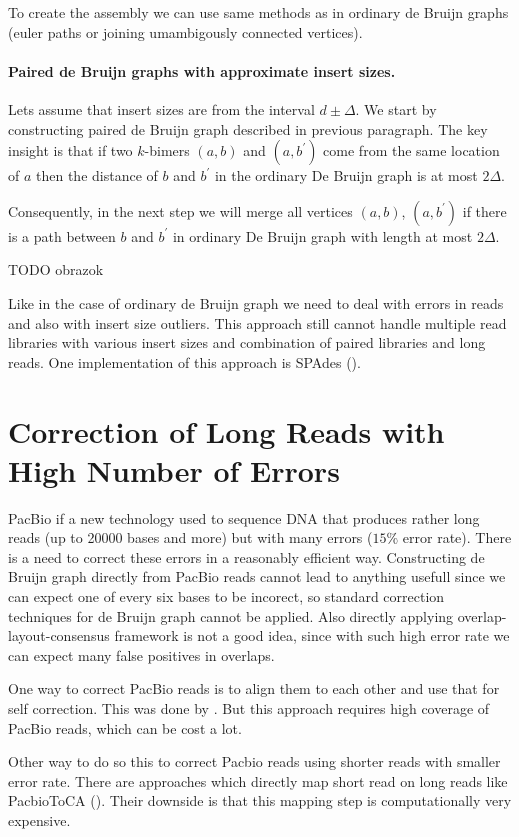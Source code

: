 To create the assembly we can use same methods as in ordinary de Bruijn graphs
(euler paths or joining umambigously connected vertices).

\paragraph{Paired de Bruijn graphs with approximate insert sizes.}
Lets assume that insert sizes are from the interval $d \pm \Delta$.
We start by constructing paired de Bruijn graph described in previous paragraph.
The key insight is that if two $k$-bimers $(a, b)$ and $(a, b^{'})$ come from
the same location of $a$ then the distance of $b$ and $b^{'}$ in the ordinary De Bruijn graph is at most $2\Delta$.

Consequently, in the next step we will merge all vertices $(a, b)$, $(a, b^{'})$ if there is a path
between $b$ and $b^{'}$ in ordinary De Bruijn graph with length at most $2\Delta$.

TODO obrazok

\bigskip
Like in the case of ordinary de Bruijn graph we need to deal with errors in reads
and also with insert size outliers. This approach still cannot handle multiple
read libraries with various insert sizes and combination of paired libraries and long reads.
One implementation of this approach is SPAdes (\cite{Spades}).


\section{Correction of Long Reads with High Number of Errors}

PacBio if a new technology used to sequence DNA that produces
rather long reads (up to 20000 bases and more) but with many errors
($15\%$ error rate). There is a need to correct these errors in a reasonably
efficient way. Constructing de Bruijn graph directly from PacBio reads
cannot lead to anything usefull since we can expect one of every six bases to be
incorect, so standard correction techniques for de Bruijn graph cannot be applied.
Also directly applying overlap-layout-consensus framework is not a good idea, since
with such high error rate we can expect many false positives in overlaps.

One way to correct PacBio reads is to align them to each other and use that for self correction.
This was done by \citet{MHAP}. But this approach requires high coverage
of PacBio reads, which can be cost a lot.

Other way to do so this to correct Pacbio reads using shorter reads with smaller
error rate. There are approaches which directly map short read on long reads like
PacbioToCA (\cite{PacbioToCA}). Their downside is that this mapping step
is computationally very expensive.

